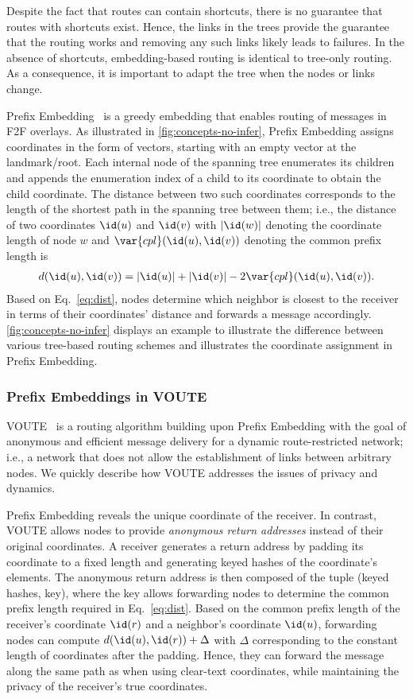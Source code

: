 Despite the fact that routes can contain shortcuts, there is no guarantee that routes with shortcuts exist. Hence, the links in the trees provide the guarantee that the routing works and removing any such links likely leads to failures. In the absence of shortcuts, embedding-based routing is identical to tree-only routing. As a consequence, it is important to adapt the tree when the nodes or links change. 

Prefix Embedding~\cite{hofer2013greedy} is a greedy embedding that enables routing of messages in F2F overlays. 
As illustrated in \cref{fig:concepts-no-infer}, 
Prefix Embedding assigns coordinates in the form of vectors, starting with an empty vector at the landmark/root. 
Each internal node of the spanning tree enumerates its children and appends the enumeration index of a child to its coordinate to obtain the child coordinate.  
The distance between two such coordinates corresponds to the length of the shortest path in the spanning tree between them; i.e., the distance of two coordinates $\id(u)$ and $\id(v)$ with $|\id(w)|$ denoting the coordinate length of node $w$ and  $\var{cpl}(\id(u),\id(v))$ denoting the common prefix length is 
\begin{align}
\label{eq:dist}
d(\id(u),\id(v)) = |\id(u)|+|\id(v)|-2\var{cpl}(\id(u), \id(v)).
\end{align}   
Based on Eq.~\ref{eq:dist}, nodes determine which neighbor is closest to the receiver in terms of their coordinates' distance and forwards a message accordingly.  
\cref{fig:concepts-no-infer} displays an example to illustrate the difference between various tree-based routing schemes and illustrates the coordinate assignment in Prefix Embedding. 

\subsubsection{Prefix Embeddings in VOUTE}
VOUTE~\cite{roos2016anonymous} is a routing algorithm building upon Prefix Embedding with the goal of anonymous and efficient message delivery for a dynamic route-restricted network; i.e., a network that does not allow the establishment of links between arbitrary nodes.
We quickly describe how VOUTE addresses the issues of privacy and dynamics. 

Prefix Embedding reveals the unique coordinate of the receiver. In contrast, VOUTE allows nodes to provide 
\emph{anonymous return addresses} instead of their original coordinates. A receiver generates a return address by padding its coordinate to a fixed length and generating keyed hashes of the coordinate's elements. The anonymous return address is then 
composed of the tuple (keyed hashes, key), where the key allows forwarding nodes to determine the common prefix length required in Eq.~\ref{eq:dist}.  
Based on the common prefix length of the receiver's coordinate $\id(r)$ and a neighbor's coordinate $\id(u)$, forwarding nodes can compute $d(\id(u), \id(r))+\Delta$ with $\Delta$ corresponding to the constant length of coordinates after the padding.
Hence, they can forward the message along the same path as when using clear-text coordinates, while maintaining the privacy of the receiver's true coordinates.


